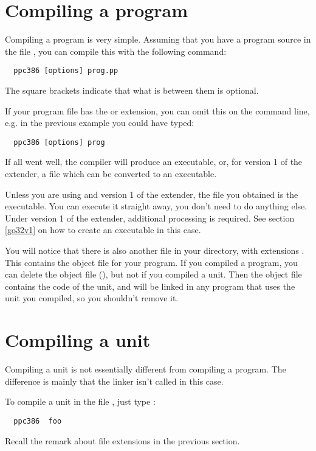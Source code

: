 \documentclass{report}
\begin{document}
\section{Compiling a program}
Compiling a program is very simple. Assuming that you have a program source
in the file , you can compile this with the following command:
\begin{verbatim}
  ppc386 [options] prog.pp
\end{verbatim}
The square brackets \var{[\ ]} indicate that what is between them is optional. 

If your program file has the  or  extension, 
you can omit this on the command line, e.g. in the previous example you 
could have typed:
\begin{verbatim}
  ppc386 [options] prog
\end{verbatim}

If all went well, the compiler will produce an executable, or, for version 1
of the \dos extender, a file which can be converted to an executable.

Unless you are using \dos and version 1 of the \dos extender, 
the file you obtained is the executable. 
You can execute it straight away, you don't need to do 
anything else. Under version 1 of the \dos extender,
additional processing is required. See section \ref{go32v1} on how to
create an executable in this case.

You will notice that there is also another file in your directory, with
extensions . This contains the object file for your program. 
If you compiled a program, you can delete the object file (), 
but not if you compiled a unit. 
Then the object file contains the code of the unit, and will be
linked in any program that uses the unit you compiled, so you shouldn't
remove it.


\section{Compiling a unit}

Compiling a unit is not essentially different from compiling a program.
The difference is mainly that the linker isn't called in this case.

To compile a unit in the file , just type :
\begin{verbatim}
  ppc386  foo
\end{verbatim}
Recall the remark about file extensions in the previous section.
\end{document}
